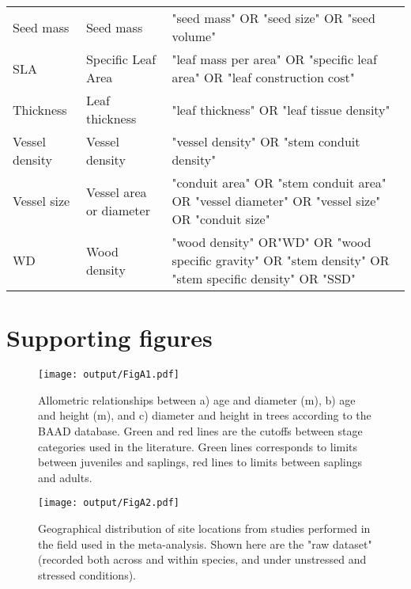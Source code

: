 \documentclass[a4paper]{article}\usepackage[]{graphicx}\usepackage[]{color}
\begin{document}
\begin{appendices}
\begin{table}[h!]
\begin{tabular}{p{3cm}p{3cm}p{8cm}}
  Seed mass & Seed mass & "seed mass" OR "seed size" OR "seed volume" \\
  SLA & Specific Leaf Area & "leaf mass per area" OR "specific leaf area" OR "leaf construction cost" \\
  Thickness & Leaf thickness & "leaf thickness"  OR "leaf tissue density" \\
  Vessel density & Vessel density & "vessel density" OR "stem conduit density" \\
  Vessel size & Vessel area or diameter & "conduit area" OR "stem conduit area" OR "vessel diameter" OR "vessel size" OR "conduit size"   \\
  WD & Wood density & "wood density" OR"WD" OR "wood specific gravity" OR "stem density" OR "stem specific density" OR "SSD" \\
   \hline
\end{tabular}
\end{table}


\clearpage
\section{Supporting figures}\label{app:supp_info_figures}


\begin{figure}[h!]
\centering
\texttt{[image: output/FigA1.pdf]}
\caption{Allometric relationships between a) age and diameter (m), b) age and height (m), and c) diameter and height in trees according to the BAAD database. Green and red lines are the cutoffs between stage categories used in the literature. Green lines corresponds to limits between juveniles and saplings, red lines to limits between saplings and adults.}
\label{FigA1}
\end{figure}


\begin{figure}[h!]
\centering
\texttt{[image: output/FigA2.pdf]}
\caption{Geographical distribution of site locations from studies performed in the field used in the meta-analysis. Shown here are the "raw dataset" (recorded both across and within species, and under unstressed and stressed conditions).}
\label{FigA2}
\end{figure}



\end{appendices}
\end{document}
